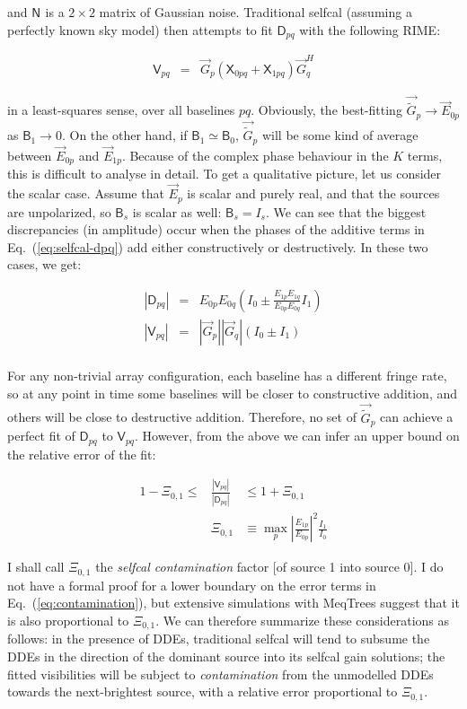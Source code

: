 \documentclass{aa}
\newcommand{\herm}{H}
\newcommand{\jones}[2]{\vec {#1}_{#2}}
\newcommand{\jonesT}[2]{\vec {#1}^{\herm}_{#2}}
\newcommand{\coh}[2]{\mathsf{{#1}}_{{#2}}}
\begin{document}
and $\coh{N}{}$ is a $2\times2$ matrix of Gaussian noise. Traditional selfcal (assuming a perfectly known sky model) then attempts to fit $\coh{D}{pq}$ with the following RIME:

\begin{eqnarray}\label{eq:selfcal-vpq}
\coh{V}{pq} & = & \jones{G}{p} ( \coh{X}{0pq} + \coh{X}{1pq} ) \jonesT{G}{q}
\end{eqnarray}

in a least-squares sense, over all baselines $pq$. Obviously, the best-fitting $\jones{\tilde G}{p}\to\jones{E}{0p}$ as $\coh{B}{1}\to0$. On the other hand, if $\coh{B}{1}\simeq\coh{B}{0}$, $\jones{\tilde G}{p}$ will be some kind of average between $\jones{E}{0p}$ and $\jones{E}{1p}$. Because of the complex phase behaviour in the $K$ terms, this is difficult to analyse in detail. To get a qualitative picture, let us consider the scalar case. Assume that $\jones{E}{p}$ is scalar and purely real, and that the sources are unpolarized, so $\coh{B}{s}$ is scalar as well: $\coh{B}{s}=I_s$. We can see that the biggest discrepancies (in amplitude) occur when the phases of the additive terms in Eq.~(\ref{eq:selfcal-dpq}) add either constructively or destructively. In these two cases, we get:

\begin{eqnarray*}
|\coh{D}{pq}| & = & E_{0p} E_{0q} ( I_0 \pm \frac{E_{1p} E_{1q}}{E_{0p} E_{0q}} I_1 ) \\
|\coh{V}{pq}| & = & |\jones{G}{p}| |\jones{G}{q}| ( I_0 \pm I_1 ) \\
\end{eqnarray*}

For any non-trivial array configuration, each baseline has a different fringe rate, so at any point in time some baselines will be closer to constructive addition, and others will be close to destructive addition. Therefore, no set of
$\jones{\tilde G}{p}$ can achieve a perfect fit of $\coh{D}{pq}$ to $\coh{V}{pq}$. However, from the above we can infer an upper bound on the relative error of the fit:

\begin{eqnarray}\label{eq:contamination}
1 -\Xi_{0,1} \le & { \displaystyle \frac{|\coh{V}{pq}|}{|\coh{D}{pq}|} } & \le 1 + \Xi_{0,1} \\
\nonumber & \Xi_{0,1} & \equiv \max_p \left| \frac{E_{1p}}{E_{0p}} \right|^2\frac{I_1}{I_0}
\end{eqnarray}

I shall call $\Xi_{0,1}$ the \emph{selfcal contamination} factor [of source 1 into source 0]. I do not have a formal proof for a lower boundary on the error terms in Eq.~(\ref{eq:contamination}), but extensive simulations with MeqTrees suggest that it is also proportional to $\Xi_{0,1}$. We can therefore summarize these considerations as follows: in the presence of DDEs, traditional selfcal will tend to subsume the DDEs in the direction of the dominant source into its selfcal gain solutions; the fitted visibilities will be subject to \emph{contamination} from the unmodelled DDEs towards the next-brightest source, with a relative error proportional to $\Xi_{0,1}$.
\end{document}
